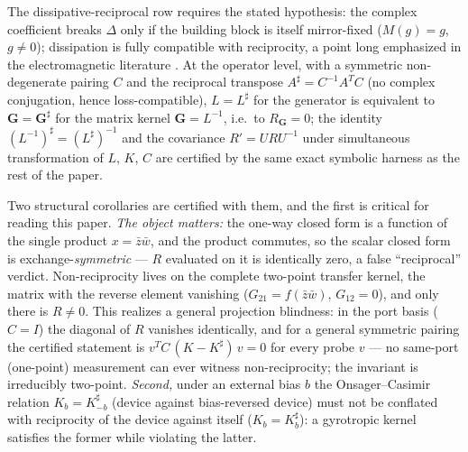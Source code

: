 \documentclass[11pt,a4paper]{article}
\newcommand{\zb}{\bar{z}}
\newcommand{\wb}{\bar{w}}
\begin{document}
The dissipative-reciprocal row requires the stated hypothesis: the complex
coefficient breaks $\Delta$ only if the building block is itself mirror-fixed
($M(g) = g$, $g \neq 0$); dissipation is fully compatible with reciprocity, a
point long emphasized in the electromagnetic literature
\cite{Caloz2018,Silveirinha2019}. At the operator level, with a symmetric
non-degenerate pairing $C$ and the reciprocal transpose
$A^{\sharp} = C^{-1} A^{T} C$ (no complex conjugation, hence loss-compatible),
$L = L^{\sharp}$ for the generator is equivalent to
$\mathbf{G} = \mathbf{G}^{\sharp}$ for the matrix kernel
$\mathbf{G} = L^{-1}$, i.e.\ to $R_{\mathbf{G}} = 0$; the identity
$(L^{-1})^{\sharp} = (L^{\sharp})^{-1}$ and the covariance $R' = U R U^{-1}$
under simultaneous transformation of $L$, $K$, $C$ are certified by the same
exact symbolic harness as the rest of the paper.

Two structural corollaries are certified with them, and the first is critical
for reading this paper. \emph{The object matters:} the one-way closed form is
a function of the single product $x = \zb\wb$, and the product commutes, so
the scalar closed form is exchange-\emph{symmetric} --- $R$ evaluated on it is
identically zero, a false ``reciprocal'' verdict. Non-reciprocity lives on the
complete two-point transfer kernel, the matrix with the reverse element
vanishing ($G_{21} = f(\zb\wb)$, $G_{12} = 0$), and only there is
$R \neq 0$. This realizes a general projection blindness: in the port basis
($C = I$) the diagonal of $R$ vanishes identically, and for a general
symmetric pairing the certified statement is $v^{T} C\,(K - K^{\sharp})\,v
= 0$ for every probe $v$ --- no same-port (one-point) measurement can ever
witness non-reciprocity; the invariant is irreducibly two-point. \emph{Second,} under
an external bias $b$ the Onsager--Casimir relation $K_b = K_{-b}^{\sharp}$
(device against bias-reversed device) must not be conflated with reciprocity
of the device against itself ($K_b = K_b^{\sharp}$): a gyrotropic kernel
satisfies the former while violating the latter.
\end{document}
